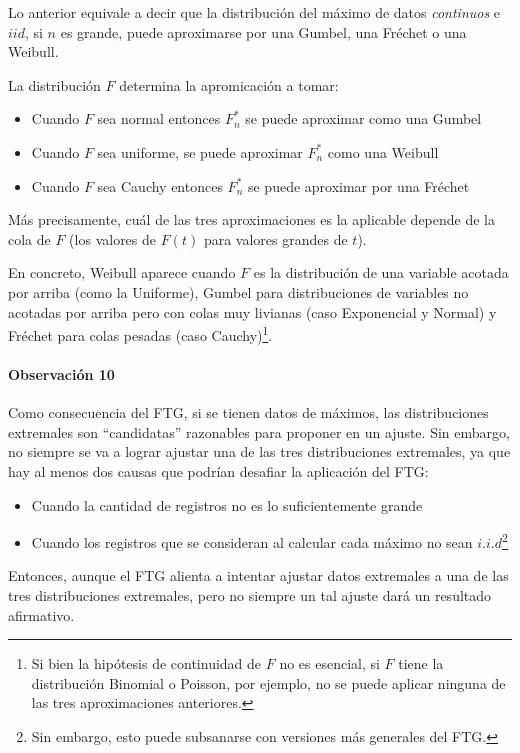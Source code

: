 \documentclass[
  12pt]{article}
\begin{document}
Lo anterior equivale a decir que la distribución del máximo de datos
\textit{continuos} e \(iid\), si \(n\) es grande, puede aproximarse por
una Gumbel, una Fréchet o una Weibull.

La distribución \(F\) determina la apromicación a tomar:

\begin{itemize}
\item Cuando $F$ sea normal entonces $F_n^*$ se puede aproximar como una Gumbel
\item Cuando $F$ sea uniforme, se puede aproximar $F_n^*$ como una Weibull
\item Cuando $F$ sea Cauchy entonces $F_n^*$ se puede aproximar por una Fréchet
\end{itemize}

Más precisamente, cuál de las tres aproximaciones es la aplicable
depende de la cola de \(F\) (los valores de \(F(t)\) para valores
grandes de \(t\)).

En concreto, Weibull aparece cuando \(F\) es la distribución de una
variable acotada por arriba (como la Uniforme), Gumbel para
distribuciones de variables no acotadas por arriba pero con colas muy
livianas (caso Exponencial y Normal) y Fréchet para colas pesadas (caso
Cauchy)\footnote{Si bien  la hipótesis de continuidad de $F$ no es esencial, si $F$ tiene
la distribución Binomial o Poisson, por ejemplo, no se puede aplicar ninguna de las tres aproximaciones anteriores.}.

\paragraph*{Observación 10}

Como consecuencia del FTG, si se tienen datos de máximos, las
distribuciones extremales son ``candidatas'' razonables para proponer en
un ajuste. Sin embargo, no siempre se va a lograr ajustar una de las
tres distribuciones extremales, ya que hay al menos dos causas que
podrían desafiar la aplicación del FTG:

\begin{itemize}
\item Cuando la cantidad de registros no es lo suficientemente grande
\item Cuando los registros que se consideran al calcular cada máximo no sean $i.i.d$\footnote{Sin embargo, esto puede subsanarse con versiones más generales del FTG.}
\end{itemize}

Entonces, aunque el FTG alienta a intentar ajustar datos extremales a
una de las tres distribuciones extremales, pero no siempre un tal ajuste
dará un resultado afirmativo.
\end{document}
